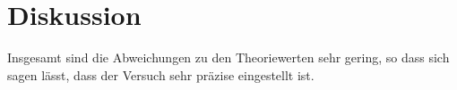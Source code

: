 \section{Diskussion}
\label{sec:Diskussion}
Insgesamt sind die Abweichungen zu den Theoriewerten sehr gering, so dass sich sagen lässt, dass der
Versuch sehr präzise eingestellt ist.